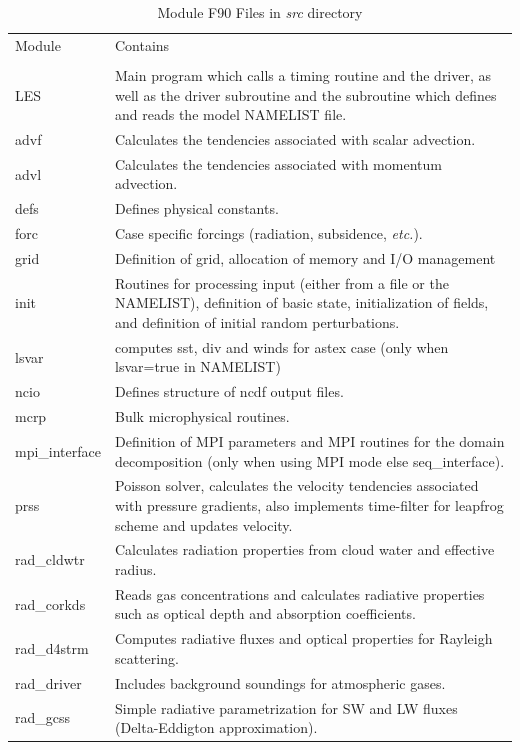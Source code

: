 \documentclass[11pt,a4paper]{article}
\begin{document}
\begin{table}
\begin{center}
\caption{Module F90 Files in \emph{src} directory} \label{tbl:modules}
\begin{tabular}[htb]{p{0.15\linewidth}p{0.85\linewidth}}
\hline \hline Module & Contains \\ \\  \hline
LES &  Main program which calls a timing
routine and the driver, as well as the driver subroutine and the
subroutine which defines and reads the model NAMELIST file. 
\\ advf &  Calculates the tendencies associated with scalar advection.
\\ advl &  Calculates the tendencies associated with momentum advection.
\\ defs &  Defines physical constants.
\\ forc &  Case specific forcings (radiation, subsidence, \emph{etc.}).
\\ grid &  Definition of grid, allocation of memory and I/O management
\\ init &  Routines for processing input (either from
a file or the NAMELIST), definition of basic state, initialization of
fields, and definition of initial random perturbations.
\\ lsvar &  computes sst, div and winds for astex case (only when lsvar=true in NAMELIST)
\\ ncio &  Defines structure of ncdf output files.
\\ mcrp &  Bulk microphysical routines.
\\ mpi\_interface & Definition of MPI parameters and MPI
routines for the domain decomposition (only when using MPI mode else seq\_interface).
\\ prss &  Poisson solver, calculates the velocity tendencies
associated with pressure gradients, also implements time-filter for
leapfrog scheme and updates velocity.
\\ rad\_cldwtr & Calculates radiation properties from cloud water and effective radius.
\\ rad\_corkds & Reads gas concentrations and calculates radiative properties such as optical depth and absorption coefficients.
\\ rad\_d4strm & Computes radiative fluxes and optical properties for Rayleigh scattering.
\\ rad\_driver & Includes background soundings for atmospheric gases.
\\ rad\_gcss & Simple radiative parametrization for SW and LW fluxes (Delta-Eddigton approximation).

\end{tabular}
\end{center}
\end{table}
\end{document}
